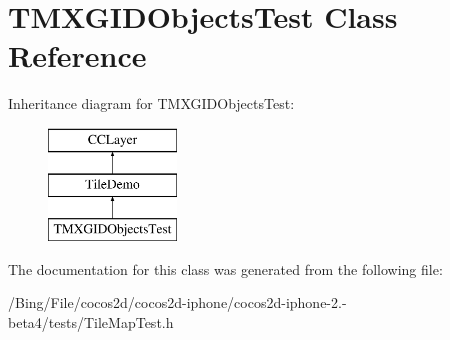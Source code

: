 \hypertarget{interface_t_m_x_g_i_d_objects_test}{\section{T\-M\-X\-G\-I\-D\-Objects\-Test Class Reference}
\label{interface_t_m_x_g_i_d_objects_test}
}
Inheritance diagram for T\-M\-X\-G\-I\-D\-Objects\-Test\-:\begin{figure}[H]
\begin{center}
\leavevmode
\includegraphics[height=3.000000cm]{interface_t_m_x_g_i_d_objects_test}
\end{center}
\end{figure}


The documentation for this class was generated from the following file\-:\begin{DoxyCompactItemize}
\item 
/\-Bing/\-File/cocos2d/cocos2d-\/iphone/cocos2d-\/iphone-\/2.-\/beta4/tests/Tile\-Map\-Test.\-h\end{DoxyCompactItemize}

